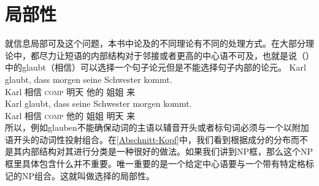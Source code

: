 
\section{局部性}
\label{Abschnitt-Diskussion-Lokalitaet}\label{sec-locality}

就信息局部可及这个问题，本书中论及的不同理论有不同的处理方式。在大部分理论中，都尽力让短语的内部结构对于邻接或者更高的中心语不可及，也就是说（）中的glaubt（相信）可以选择一个句子论元但是不能选择句子内部的论元。
\eal
\ex 
\gll Karl glaubt, dass morgen seine Schwester kommt.\\
	 Karl 相信 \textsc{comp} 明天 他的 姐姐 来\\
\ex 
\gll Karl glaubt, dass seine Schwester morgen kommt.\\
	 Karl 相信 \textsc{comp} 他的 姐姐 明天 来\\
\zl
所以，例如glauben不能确保动词的主语以辅音开头或者标句词必须与一个以附加语开头的动词性投射组合。在\ref{Abschnitt-Kopf}中，我们看到根据成分的分布而不是其内部结构对其进行分类是一种很好的做法。如果我们讲到NP框，那么这个NP框里具体包含什么并不重要。唯一重要的是一个给定中心语要与一个带有特定格标记的NP组合。这就叫做选择的局部性。

